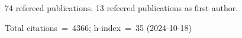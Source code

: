 74 refereed publications. 13 refeered publications as first author.

Total citations~=~4366; h-index~=~35 (2024-10-18)